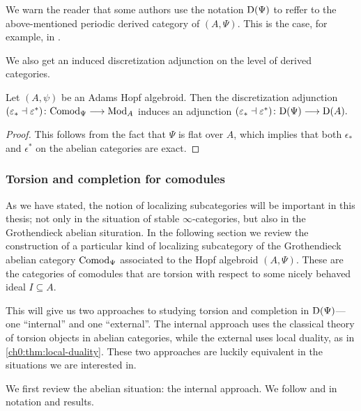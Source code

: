 \begin{remark}
    We warn the reader that some authors use the notation $\mathrm{D}(\Psi)$ to reffer to the above-mentioned periodic derived category of $(A, \Psi)$. This is the case, for example, in \cite{pstragowski_2021}. 
\end{remark}

We also get an induced discretization adjunction on the level of derived categories. 

\begin{proposition}
    Let $(A,\psi)$ be an Adams Hopf algebroid. Then the discretization adjunction $(\varepsilon_*\dashv \varepsilon^*)\colon \mathrm{Comod}_\Psi\longrightarrow \mathrm{Mod}_A$ induces an adjunction $(\varepsilon_*\dashv \varepsilon^*)\colon \mathrm{D}(\Psi)\longrightarrow \mathrm{D}(A).$
\end{proposition}
\begin{proof}
    This follows from the fact that $\Psi$ is flat over $A$, which implies that both $\epsilon_*$ and $\epsilon^*$ on the abelian categories are exact. 
\end{proof}




\subsubsection{Torsion and completion for comodules}
\label{ch0:sssec:torsion-and-completion-for-comodules}

As we have stated, the notion of localizing subcategories will be important in this thesis; not only in the situation of stable $\infty$-categories, but also in the Grothendieck abelian situration. In the following section we review the construction of a particular kind of localizing subcategory of the Grothendieck abelian category $\mathrm{Comod}_\Psi$ associated to the Hopf algebroid $(A,\Psi)$. These are the categories of comodules that are torsion with respect to some nicely behaved ideal $I\subseteq A$. 

This will give us two approaches to studying torsion and completion in $\mathrm{D}(\Psi)$---one ``internal'' and one ``external''. The internal approach uses the classical theory of torsion objects in abelian categories, while the external uses local duality, as in \cref{ch0:thm:local-duality}. These two approaches are luckily equivalent in the situations we are interested in. 

We first review the abelian situation: the internal approach. We follow \cite{barthel-heard-valenzuela_2018} and \cite{barthel-heard-valenzuela_2020} in notation and results. 

